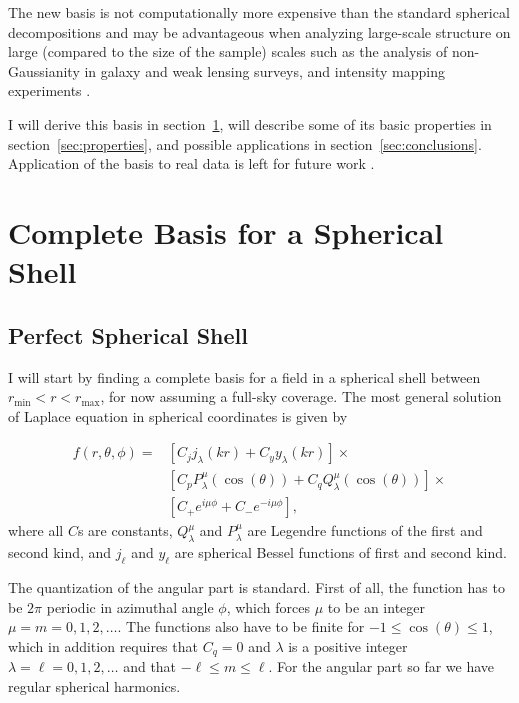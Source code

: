 \documentclass[fleqn,usenatbib]{mnras}
\newcommand{\rmin}{r_\mathrm{min}}
\newcommand{\rmax}{r_\mathrm{max}}
\begin{document}
The new basis is not computationally more expensive than the standard spherical
decompositions and may be advantageous when analyzing large-scale structure on
large (compared to the size of the sample) scales such as the analysis of
non-Gaussianity in galaxy and weak lensing surveys, and intensity mapping
experiments
\citep[e.g.,][]{2016ApJ...833..242L,2014MNRAS.442.1326K}.

I will derive this basis in section~\ref{sec:basis}, will describe some of
its basic properties in section~\ref{sec:properties}, and possible applications
in section~\ref{sec:conclusions}. Application of the basis to real data is left
for future work \citep[see, ][for an example of how the new basis is used in
computing signal to noise of future 21cm experiments]{Pullen2019}.

\section{Complete Basis for a Spherical Shell}
\label{sec:basis}

\subsection{Perfect Spherical Shell}
\label{ssec:perfectshell}

I will start by finding a complete basis for a field in a spherical shell
between $\rmin < r < \rmax$, for now assuming a full-sky coverage. The most
general solution of Laplace equation in spherical coordinates is given by

\begin{align} 
\label{eq:generalsol}
f(r,\theta,\phi) = &\left[C_jj_\lambda(kr) + C_yy_\lambda(kr)\right]\times\\
\nonumber
&\left [C_pP^\mu_\lambda (\cos (\theta)) + C_qQ^\mu_\lambda(\cos
(\theta))\right]\times\\
\nonumber
&\left[C_+e^{i\mu\phi} + C_-e^ {-i\mu\phi}\right],
\end{align} 
\noindent
where all $C$s are constants, $Q^\mu_\lambda$ and $P^\mu_\lambda$ are Legendre
functions of the first and second kind, and $j_\ell$ and $y_\ell$ are
spherical Bessel functions of first and second kind.

The quantization of the angular part is standard. First of all, the function
has to be $2\pi$ periodic in azimuthal angle $\phi$, which forces $\mu$ to be
an integer $\mu = m = 0, 1, 2, \ldots$. The functions also have to be finite
for $-1 \leq \cos(\theta) \leq 1$, which in addition requires that $C_q=0$ and
$\lambda$ is a positive integer $\lambda = \ell = 0, 1, 2, \ldots$ and that
$-\ell \leq m \leq \ell$.  For the angular part so far we have regular
spherical harmonics.
\end{document}
